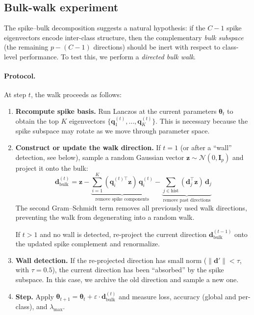 \documentclass[11pt,a4paper]{article}
\newcommand{\norm}[1]{\lVert #1 \rVert}
\newcommand{\mat}[1]{\bm{#1}}
\newcommand{\vect}[1]{\bm{#1}}
\begin{document}
\subsection{Bulk-walk experiment}
\label{app:bulk-walk}


The spike--bulk decomposition suggests a natural hypothesis: if the
$C{-}1$ spike eigenvectors encode inter-class structure, then the
complementary \emph{bulk subspace} (the remaining $p - (C{-}1)$
directions) should be inert with respect to class-level performance.
To test this, we perform a \emph{directed bulk walk}.

\paragraph{Protocol.} At step $t$, the walk proceeds as follows:
\begin{enumerate}
    \item \textbf{Recompute spike basis.} Run Lanczos at the current
      parameters $\vect{\theta}_t$ to obtain the top $K$ eigenvectors
      $\{\vect{q}_1^{(t)}, \ldots, \vect{q}_K^{(t)}\}$. This is
      necessary because the spike subspace may rotate as we move
      through parameter space.

    \item \textbf{Construct or update the walk direction.} If $t = 1$
      (or after a ``wall'' detection, see below), sample a random
      Gaussian vector $\vect{z} \sim \mathcal{N}(0, \mat{I}_p)$ and
      project it onto the bulk:
      \begin{equation}
      \vect{d}_{\mathrm{bulk}}^{(t)} = \vect{z}
        - \underbrace{\sum_{i=1}^{K}
          (\vect{q}_i^{(t)\top} \vect{z})\,
          \vect{q}_i^{(t)}}_{\text{remove spike components}}
        - \underbrace{\sum_{j \in \mathrm{hist}}
          (\vect{d}_j^\top \vect{z})\,
          \vect{d}_j}_{\text{remove past directions}}
      \label{eq:bulk-proj}
      \end{equation}
      The second Gram--Schmidt term removes all previously used walk
      directions, preventing the walk from degenerating into a random
      walk.

      If $t > 1$ and no wall is detected, re-project the current
      direction $\vect{d}_{\mathrm{bulk}}^{(t-1)}$ onto the updated
      spike complement and renormalize.

    \item \textbf{Wall detection.} If the re-projected direction has
      small norm ($\norm{\vect{d}'} < \tau$, with $\tau = 0.5$), the
      current direction has been ``absorbed'' by the spike subspace.
      In this case, we archive the old direction and sample a new one.

    \item \textbf{Step.} Apply
      $\vect{\theta}_{t+1} = \vect{\theta}_t + \varepsilon \cdot
      {\vect{d}}_{\mathrm{bulk}}^{(t)}$
      and measure loss, accuracy (global and per-class), and
      $\lambda_{\max}$.
\end{enumerate}
\end{document}
